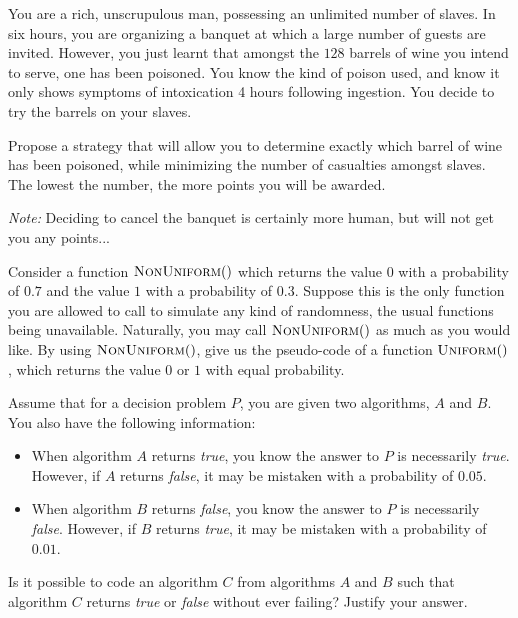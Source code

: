 \documentclass[12pt,addpoints]{exam}
\begin{document}
\begin{questions}
\question
You are a rich, unscrupulous man, possessing an unlimited number of slaves.
In six hours, you are organizing a banquet at which a large number of guests are invited.
However, you just learnt that amongst the $128$ barrels of wine you intend to serve, one has been poisoned.
You know the kind of poison used, and know it only shows symptoms of intoxication 4 hours following ingestion.
You decide to try the barrels on your slaves.

Propose a strategy that will allow you to determine exactly which barrel of wine has been poisoned, while minimizing the number of casualties amongst slaves. The lowest the number, the more points you will be awarded.

\emph{Note:} Deciding to cancel the banquet is certainly more human, but will not get you any points...


\question
Consider a function $\Call{NonUniform}$ which returns the value $0$ with a probability of $0.7$ and the value $1$ with a probability of $0.3$.
Suppose this is the only function you are allowed to call to simulate any kind of randomness, the usual functions being unavailable.
Naturally, you may call $\Call{NonUniform}$ as much as you would like.
By using $\Call{NonUniform}$, give us the pseudo-code of a function $\Call{Uniform}$, which returns the value $0$ or $1$ with equal probability.
\begin{solution}
\end{solution}

\question
Assume that for a decision problem $P$, you are given two algorithms, $A$ and
$B$. You also have the following information:
\begin{itemize}
  \item When algorithm $A$ returns \emph{true}, you know the answer to $P$ is necessarily \emph{true}. However, if $A$ returns \emph{false}, it may be mistaken with a probability of $0.05$.
  \item When algorithm $B$ returns \emph{false}, you know the answer to $P$ is necessarily \emph{false}. However, if $B$ returns \emph{true}, it may be mistaken with a probability of $0.01$.
\end{itemize}
Is it possible to code an algorithm $C$ from algorithms $A$ and $B$ such that algorithm $C$ returns \emph{true} or \emph{false} without ever failing? Justify your answer.


\end{questions}
\end{document}

